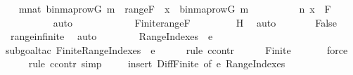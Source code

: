 \begin{isabellebody}
\ \isamarkupfalse%
\ {\isachardoublequoteopen}{\isasymexists}m{\isasymin}nat{\isachardot}{\kern0pt}\ binmap{\isacharunderscore}{\kern0pt}row{\isacharparenleft}{\kern0pt}G{\isacharcomma}{\kern0pt}\ m{\isacharparenright}{\kern0pt}\ {\isasymin}\ range{\isacharparenleft}{\kern0pt}F{\isacharparenright}{\kern0pt}\ {\isasymand}\ x\ {\isacharequal}{\kern0pt}\ binmap{\isacharunderscore}{\kern0pt}row{\isacharparenleft}{\kern0pt}G{\isacharcomma}{\kern0pt}\ m{\isacharparenright}{\kern0pt}{\isachardoublequoteclose}\isanewline
\ \ \ \ \ \ \ \ \isamarkupfalse%
\ {\isacartoucheopen}{\isacharless}{\kern0pt}n{\isacharcomma}{\kern0pt}\ x{\isachargreater}{\kern0pt}\ {\isasymin}\ F{\isacartoucheclose}\isanewline
\ \ \ \ \ \ \ \ \isamarkupfalse%
\ auto\isanewline
\ \ \ \ \isamarkupfalse%
\isanewline
\ \ \ \ \isamarkupfalse%
\ \isamarkupfalse%
\ {\isachardoublequoteopen}Finite{\isacharparenleft}{\kern0pt}range{\isacharparenleft}{\kern0pt}F{\isacharparenright}{\kern0pt}{\isacharparenright}{\kern0pt}{\isachardoublequoteclose}\ \isanewline
\ \ \ \ \ \ \isamarkupfalse%
\ H\ \isamarkupfalse%
\ auto\isanewline
\ \ \ \ \isamarkupfalse%
\ \isamarkupfalse%
\ False\ \isamarkupfalse%
\ rangeinfinite\ \isamarkupfalse%
\ auto\isanewline
\ \ \isamarkupfalse%
\isanewline
\isanewline
\ \ \isamarkupfalse%
\ \isamarkupfalse%
\ {\isachardoublequoteopen}{\isacharquery}{\kern0pt}RangeIndexes\ {\isacharminus}{\kern0pt}\ e\ {\isasymnoteq}\ {}{\isachardoublequoteclose}\ \isanewline
\ \ \ \ \isamarkupfalse%
{\isacharparenleft}{\kern0pt}subgoal{\isacharunderscore}{\kern0pt}tac\ {\isachardoublequoteopen}{\isasymnot}Finite{\isacharparenleft}{\kern0pt}{\isacharquery}{\kern0pt}RangeIndexes\ {\isacharminus}{\kern0pt}\ e{\isacharparenright}{\kern0pt}{\isachardoublequoteclose}{\isacharparenright}{\kern0pt}\isanewline
\ \ \ \ \ \isamarkupfalse%
{\isacharparenleft}{\kern0pt}rule\ ccontr{\isacharparenright}{\kern0pt}\isanewline
\ \ \ \ \isamarkupfalse%
\ Finite{\isacharunderscore}{\kern0pt}{}\isanewline
\ \ \ \ \ \isamarkupfalse%
\ force\isanewline
\ \ \ \ \isamarkupfalse%
{\isacharparenleft}{\kern0pt}rule\ ccontr{\isacharcomma}{\kern0pt}\ simp{\isacharparenright}{\kern0pt}\isanewline
\ \ \ \ \isamarkupfalse%
{\isacharparenleft}{\kern0pt}insert\ Diff{\isacharunderscore}{\kern0pt}Finite\ {\isacharbrackleft}{\kern0pt}of\ e\ {\isacharquery}{\kern0pt}RangeIndexes{\isacharbrackright}{\kern0pt}{\isacharparenright}{\kern0pt}\isanewline

\end{isabellebody}
